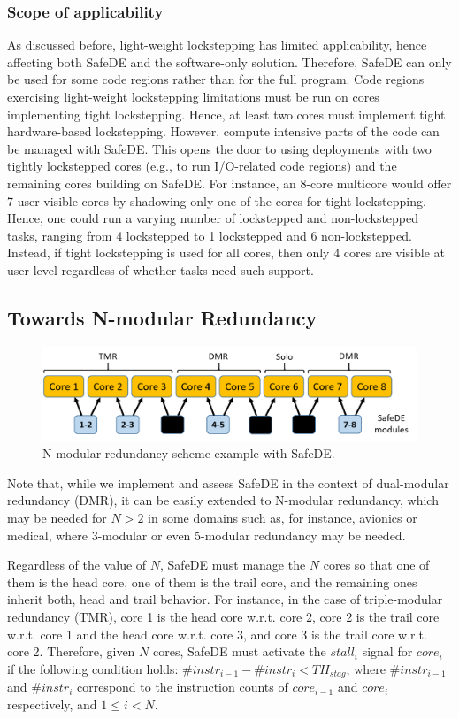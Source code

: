 \subsubsection{Scope of applicability}
As discussed before, light-weight lockstepping has limited applicability, hence affecting both SafeDE and the software-only solution. Therefore, SafeDE can only be used for some code regions rather than for the full program. Code regions exercising light-weight lockstepping limitations must be run on cores implementing tight lockstepping. Hence, at least two cores must implement tight hardware-based lockstepping. However, compute intensive parts of the code can be managed with SafeDE. This opens the door to using deployments with two tightly lockstepped cores (e.g., to run I/O-related code regions) and the remaining cores building on SafeDE. For instance, an 8-core multicore would offer 7 user-visible cores by shadowing only one of the cores for tight lockstepping. Hence, one could run a varying number of lockstepped and non-lockstepped tasks, ranging from 4 lockstepped to 1 lockstepped and 6 non-lockstepped. Instead, if tight lockstepping is used for all cores, then only 4 cores are visible at user level regardless of whether tasks need such support.

\subsection{Towards N-modular Redundancy}

\begin{figure}[t!]
\centering
  \includegraphics[width=1\columnwidth]{imgs/Nmodular.png} 
  \caption{N-modular redundancy scheme example with SafeDE.}
  \label{fig:Nmodular}
\end{figure}


Note that, while we implement and assess SafeDE in the context of dual-modular redundancy (DMR), it can be easily extended to N-modular redundancy, which may be needed for $N>2$ in some domains such as, for instance, avionics or medical, where 3-modular or even 5-modular redundancy may be needed. 

Regardless of the value of $N$, SafeDE must manage the $N$ cores so that one of them is the head core, one of them is the trail core, and the remaining ones inherit both, head and trail behavior. For instance, in the case of triple-modular redundancy (TMR), core 1 is the head core w.r.t. core 2, core 2 is the trail core w.r.t. core 1 and the head core w.r.t. core 3, and core 3 is the trail core w.r.t. core 2.
Therefore, given $N$ cores, SafeDE must activate the $stall_i$ signal for $core_i$ if the following condition holds: $\#instr_{i-1} - \#instr_{i} < TH_{stag}$, where $\#instr_{i-1}$ and $\#instr_i$ correspond to the instruction counts of $core_{i-1}$ and $core_i$ respectively, and $1 \le i < N$.

